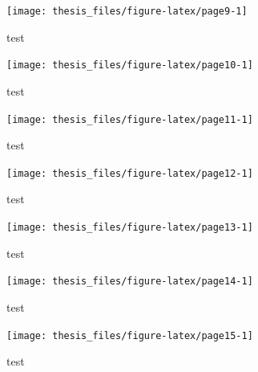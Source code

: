 \documentclass[12pt,oneside]{reedthesis}
\begin{document}
\footnotesize
\begin{figure}

{\centering \texttt{[image: thesis\_files/figure-latex/page9-1]} 

}

\caption{test}\label{fig:page9}
\end{figure}
\normalsize

\footnotesize
\begin{figure}

{\centering \texttt{[image: thesis\_files/figure-latex/page10-1]} 

}

\caption{test}\label{fig:page10}
\end{figure}
\normalsize

\footnotesize
\begin{figure}

{\centering \texttt{[image: thesis\_files/figure-latex/page11-1]} 

}

\caption{test}\label{fig:page11}
\end{figure}
\normalsize

\footnotesize
\begin{figure}

{\centering \texttt{[image: thesis\_files/figure-latex/page12-1]} 

}

\caption{test}\label{fig:page12}
\end{figure}
\normalsize

\footnotesize
\begin{figure}

{\centering \texttt{[image: thesis\_files/figure-latex/page13-1]} 

}

\caption{test}\label{fig:page13}
\end{figure}
\normalsize

\footnotesize
\begin{figure}

{\centering \texttt{[image: thesis\_files/figure-latex/page14-1]} 

}

\caption{test}\label{fig:page14}
\end{figure}
\normalsize

\footnotesize
\begin{figure}

{\centering \texttt{[image: thesis\_files/figure-latex/page15-1]} 

}

\caption{test}\label{fig:page15}
\end{figure}
\normalsize
\end{document}
